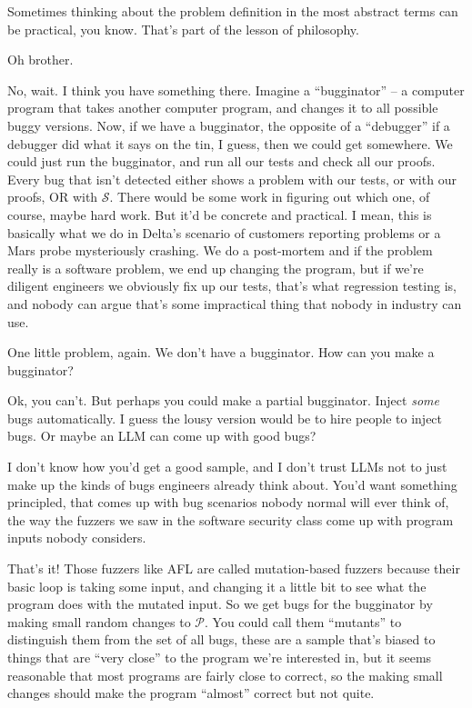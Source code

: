 \documentclass[sigplan]{acmart}
\begin{document}
  Sometimes thinking about the problem
definition in the most abstract terms can be practical, you know.
That's part of the lesson of philosophy.

  Oh brother.

  No, wait.  I think you have something
there.  Imagine a ``bugginator'' -- a computer program that takes
another computer program, and changes it to all possible buggy
versions.  Now, if we have a bugginator, the opposite of a
``debugger'' if a debugger did what it says on the tin, I guess, then
we could get somewhere.  We could just run the bugginator, and run all
our tests and check all our proofs.  Every bug that isn't detected
either shows a problem with our tests, or with our proofs, OR with
$\mathcal{S}$.  There would be some work in figuring out which one, of
course, maybe hard work.  But it'd be concrete and practical.  I mean,
this is basically what we do in Delta's scenario of customers
reporting problems or a Mars probe mysteriously crashing.  We do a
post-mortem and if the problem really is a software problem, we end up
changing the program, but if we're diligent engineers we obviously fix
up our tests, that's what regression testing is, and nobody can argue
that's some impractical thing that nobody in industry can use.

  One little problem, again.   We don't
have a bugginator.  How can you make a bugginator?

   Ok, you can't.  But perhaps you could
make a partial bugginator.  Inject \emph{some} bugs automatically.  I
guess the lousy version would be to hire people to inject bugs.  Or
maybe an LLM can come up with good bugs?

  I don't know how you'd get a good sample,
and I don't trust LLMs not to just make up the kinds of bugs engineers
already think about.  You'd want something principled, that comes up
with bug scenarios nobody normal will ever think of, the way the
fuzzers we saw in the software security class
come up with program inputs nobody considers.

  That's it!  Those fuzzers like AFL are
called mutation-based fuzzers because their basic loop is taking some
input, and changing it a little bit to see what the program does with
the mutated input.  So we get bugs for the bugginator by making small
random changes to $\mathcal{P}$.  You could call them ``mutants'' to
distinguish them from the set of all bugs, these are a sample that's
biased to things that are ``very close'' to the program we're
interested in, but it seems reasonable that most programs are fairly
close to correct, so the making small changes should make the program
``almost'' correct but not quite.
\end{document}
